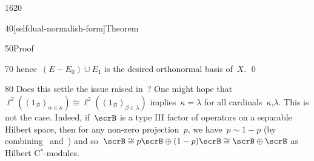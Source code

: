 \begin{parsec}{1620}
\begin{point}{40}[selfdual-normalish-form]{Theorem}
\begin{point}{50}{Proof}
\begin{point}{70}
    hence~$(E - E_0) \cup E_1$ is the desired orthonormal basis of~$X$. \qed
\end{point}
\end{point}
\end{point}
\begin{point}{80}%
Does this settle the issue raised
        in~?
      One might hope
    that~$\ell^2((1_{\mathscr{B}})_{\alpha \in \kappa}) \cong
        \ell^2((1_{\mathscr{B}})_{\beta\in\lambda})$
    implies~$\kappa=\lambda$ for all cardinals~$\kappa$,$\lambda$.
This is not the case.
Indeed, if~$\scrB$ is a type III factor
    of operators on a separable Hilbert space,
    then for any non-zero projection~$p$,
    we have~$p \sim 1 -p$ (by combining~\cite[dfn.~6.5.1]{kr}
        and~\cite[cor.~6.3.5]{kr})
    and so~$\scrB \cong p\scrB \oplus (1-p)\scrB \cong 
    \scrB \oplus \scrB$ as Hilbert C$^*$-modules.
\end{point}
\end{parsec}

